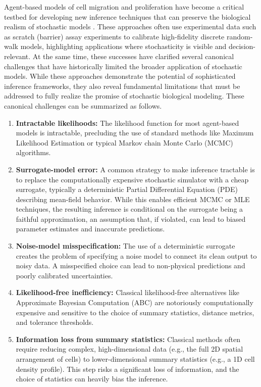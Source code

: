 \documentclass{article}
\begin{document}
Agent-based models of cell migration and proliferation have become a critical testbed for developing new inference techniques that can preserve the biological realism of stochastic models \citep{Carr2021,SIMPSON2022111201,Simpson2025.05.25.656057}. These approaches often use experimental data such as scratch (barrier) assay experiments to calibrate high-fidelity discrete random-walk models, highlighting applications where stochasticity is visible and decision-relevant. At the same time, these successes have clarified several canonical challenges that have historically limited the broader application of stochastic models. While these approaches demonstrate the potential of sophisticated inference frameworks, they also reveal fundamental limitations that must be addressed to fully realize the promise of stochastic biological modeling. These canonical challenges can be summarized as follows. 
\begin{enumerate} 
	\item \textbf{Intractable likelihoods:} The likelihood function for most agent-based models is intractable, precluding the use of standard methods like Maximum Likelihood Estimation or typical Markov chain Monte Carlo (MCMC) algorithms. 
	\item \textbf{Surrogate-model error:} A common strategy to make inference tractable is to replace the computationally expensive stochastic simulator with a cheap surrogate, typically a deterministic Partial Differential Equation (PDE) describing mean-field behavior. While this enables efficient MCMC or MLE techniques, the resulting inference is conditional on the surrogate being a faithful approximation, an assumption that, if violated, can lead to biased parameter estimates and inaccurate predictions. 
	\item \textbf{Noise-model misspecification:} The use of a deterministic surrogate creates the problem of specifying a noise model to connect its clean output to noisy data. A misspecified choice can lead to non-physical predictions and poorly calibrated uncertainties. 
	\item \textbf{Likelihood-free inefficiency:} Classical likelihood-free alternatives like Approximate Bayesian Computation (ABC) are notoriously computationally expensive and sensitive to the choice of summary statistics, distance metrics, and tolerance thresholds.
	\item \textbf{Information loss from summary statistics:} Classical methods often require reducing complex, high-dimensional data (e.g., the full 2D spatial arrangement of cells) to lower-dimensional summary statistics (e.g., a 1D cell density profile). This step risks a significant loss of information, and the choice of statistics can heavily bias the inference. 
	 \end{enumerate}
\end{document}
